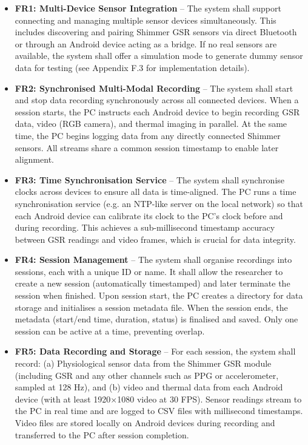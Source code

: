 \begin{itemize}
\item \textbf{FR1: Multi-Device Sensor Integration} -- The system shall support connecting and managing multiple sensor devices simultaneously. This includes discovering and pairing Shimmer GSR sensors via direct Bluetooth or through an Android device acting as a bridge. If no real sensors are available, the system shall offer a simulation mode to generate dummy sensor data for testing (see Appendix F.3 for implementation details).

\item \textbf{FR2: Synchronised Multi-Modal Recording} -- The system shall start and stop data recording synchronously across all connected devices. When a session starts, the PC instructs each Android device to begin recording GSR data, video (RGB camera), and thermal imaging in parallel. At the same time, the PC begins logging data from any directly connected Shimmer sensors. All streams share a common session timestamp to enable later alignment.

\item \textbf{FR3: Time Synchronisation Service} -- The system shall synchronise clocks across devices to ensure all data is time-aligned. The PC runs a time synchronisation service (e.g. an NTP-like server on the local network) so that each Android device can calibrate its clock to the PC's clock before and during recording. This achieves a sub-millisecond timestamp accuracy between GSR readings and video frames, which is crucial for data integrity.

\item \textbf{FR4: Session Management} -- The system shall organise recordings into sessions, each with a unique ID or name. It shall allow the researcher to create a new session (automatically timestamped) and later terminate the session when finished. Upon session start, the PC creates a directory for data storage and initialises a session metadata file. When the session ends, the metadata (start/end time, duration, status) is finalised and saved. Only one session can be active at a time, preventing overlap.

\item \textbf{FR5: Data Recording and Storage} -- For each session, the system shall record: (a) Physiological sensor data from the Shimmer GSR module (including GSR and any other channels such as PPG or accelerometer, sampled at 128 Hz), and (b) video and thermal data from each Android device (with at least 1920×1080 video at 30 FPS). Sensor readings stream to the PC in real time and are logged to CSV files with millisecond timestamps. Video files are stored locally on Android devices during recording and transferred to the PC after session completion.


\end{itemize}
